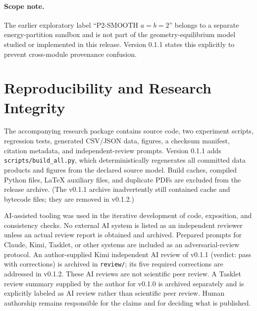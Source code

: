 \documentclass[11pt]{article}
\begin{document}
\paragraph{Scope note.} The earlier exploratory label ``P2-SMOOTH $a=b=2$'' belongs to a separate energy-partition sandbox and is not part of the geometry-equilibrium model studied or implemented in this release. Version 0.1.1 states this explicitly to prevent cross-module provenance confusion.

\section{Reproducibility and Research Integrity}
The accompanying research package contains source code, two experiment scripts, regression tests, generated CSV/JSON data, figures, a checksum manifest, citation metadata, and independent-review prompts. Version 0.1.1 adds \texttt{scripts/build\_all.py}, which deterministically regenerates all committed data products and figures from the declared source model. Build caches, compiled Python files, LaTeX auxiliary files, and duplicate PDFs are excluded from the release archive. (The v0.1.1 archive inadvertently still contained cache and bytecode files; they are removed in v0.1.2.)

AI-assisted tooling was used in the iterative development of code, exposition, and consistency checks. No external AI system is listed as an independent reviewer unless an actual review report is obtained and archived. Prepared prompts for Claude, Kimi, Tasklet, or other systems are included as an adversarial-review protocol. An author-supplied Kimi independent AI review of v0.1.1 (verdict: pass with corrections) is archived in \texttt{review/}; its five required corrections are addressed in v0.1.2. These AI reviews are not scientific peer review. A Tasklet review summary supplied by the author for v0.1.0 is archived separately and is explicitly labeled as AI review rather than scientific peer review. Human authorship remains responsible for the claims and for deciding what is published.
\end{document}
